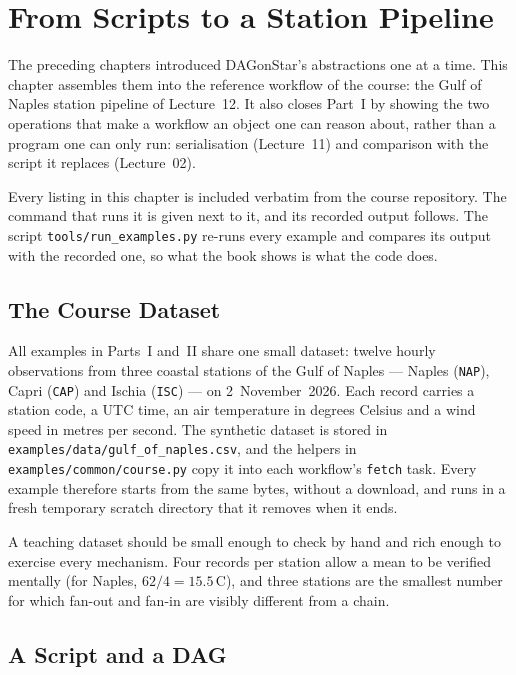 \chapter{From Scripts to a Station Pipeline}
\label{ch:course-pipeline}

The preceding chapters introduced DAGonStar's abstractions one at a time. This
chapter assembles them into the reference workflow of the course: the Gulf of
Naples station pipeline of Lecture~12. It also closes Part~I by showing the two
operations that make a workflow an object one can reason about, rather than a
program one can only run: serialisation (Lecture~11) and comparison with the
script it replaces (Lecture~02).

Every listing in this chapter is included verbatim from the course
repository. The command that runs it is given next to it, and its recorded
output follows. The script \texttt{tools/run\_examples.py} re-runs every
example and compares its output with the recorded one, so what the book shows
is what the code does.

\section{The Course Dataset}

All examples in Parts~I and~II share one small dataset: twelve hourly
observations from three coastal stations of the Gulf of Naples --- Naples
(\texttt{NAP}), Capri (\texttt{CAP}) and Ischia (\texttt{ISC}) --- on
2~November~2026. Each record carries a station code, a UTC time, an air
temperature in degrees Celsius and a wind speed in metres per second. The
synthetic dataset is stored in \texttt{examples/data/gulf\_of\_naples.csv}, and
the helpers in \texttt{examples/common/course.py} copy it into each workflow's
\texttt{fetch} task. Every example therefore starts from the same bytes,
without a download, and runs in a fresh temporary scratch directory that it
removes when it ends.

\begin{practicebox}
A teaching dataset should be small enough to check by hand and rich enough
to exercise every mechanism. Four records per station allow a mean to be
verified mentally (for Naples, $62/4 = 15.5$\,\textdegree C), and three stations
are the smallest number for which fan-out and fan-in are visibly different
from a chain.
\end{practicebox}

\section{A Script and a DAG}

